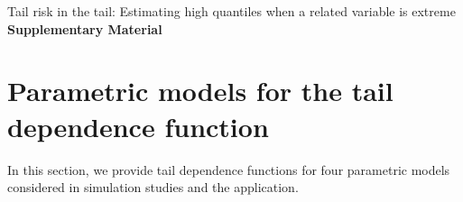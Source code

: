 \appendix
\def\thesection{S\arabic{section}}
\def\thesubsection{S\arabic{section}.\arabic{subsection}}
\setcounter{equation}{0}
\renewcommand{\theequation}{S\arabic{equation}}
\setcounter{page}{1}

\begin{center}
    {\LARGE Tail risk in the tail: Estimating high quantiles when a related variable is extreme\\
  \bf Supplementary Material\\
  }
\end{center}


\section{Parametric models for the tail dependence function}\label{sS3}
In this section, we provide tail dependence functions for four parametric models considered in simulation studies and the application. 

